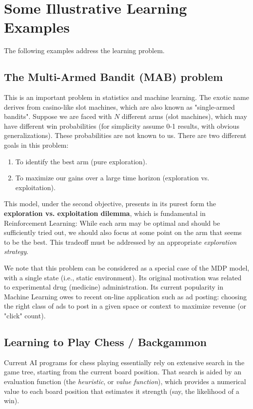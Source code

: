 \section{Some Illustrative Learning Examples}
The following examples address the learning problem.

\subsection{The Multi-Armed Bandit (MAB) problem}
This is an important problem in statistics and machine learning. The exotic name derives from casino-like slot machines, which are also known as "single-armed bandits".
Suppose we are faced with $N$ different arms (slot machines), which may have different win probabilities (for simplicity assume 0-1 results, with obvious generalizations). These probabilities are not known to us.
There are two different goals in this problem:
\begin{enumerate}
  \item To identify the best arm (pure exploration).
  \item To maximize our gains over a large time horizon (exploration vs. exploitation).
\end{enumerate}

This model, under the second objective, presents in its purest form the \textbf{exploration vs. exploitation dilemma}, which is fundamental in Reinforcement Learning: While each arm may be optimal and should be sufficiently tried out, we should also focus at some point on the arm that seems to be the best. This tradeoff must be addressed by an appropriate  \emph{exploration strategy}.

We note that this problem can be considered as a special case of the MDP model, with a single state (i.e., static environment). Its original motivation was related to experimental drug (medicine) administration. Its current popularity in Machine Learning owes to recent on-line application such as ad posting: choosing the right class of ads to post in a given space or context to maximize revenue (or "click" count).

\subsection{Learning to Play Chess / Backgammon}
Current AI programs for chess playing essentially rely on extensive search in the game tree, starting from the current board position. That search is aided by an evaluation function (the \emph{heuristic}, or \emph{value function}), which provides a numerical value to each board position that estimates it strength (say, the likelihood of a win).

